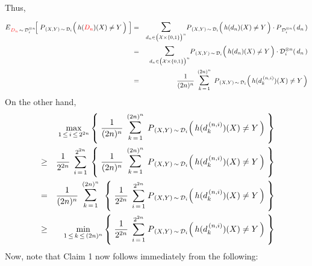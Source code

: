 Thus,
\begin{eqnarray*}
\overset{{\color{white}\vert}}{E}_{{\color{red}D_{n}}\,\sim\,\mathcal{D}_{i}^{\otimes n}}\!\!\left[\;
	P_{\,(X,Y)\,\sim\,\mathcal{D}_{i}}\!\left(\,h({\color{red}D_{n}})(X) \overset{{\color{white}.}}{\neq} Y\,\right)
	\;\right]
& = &
	\underset{d_{n}\in\left(\mathcal{X}\overset{{\color{white}.}}{\times}\{0,1\}\right)^{n}}{\textnormal{\Large$\sum$}}
	P_{\,(X,Y)\,\sim\,\mathcal{D}_{i}}\!\left(\,h(d_{n})(X) \overset{{\color{white}.}}{\neq} Y\,\right)
	\cdot
	P_{\,\mathcal{D}_{i}^{\otimes n}}(\,d_{n}\,)
\\
& = &
	\underset{d_{n}\in\left(\mathcal{X}\overset{{\color{white}.}}{\times}\{0,1\}\right)^{n}}{\textnormal{\Large$\sum$}}
	P_{\,(X,Y)\,\sim\,\mathcal{D}_{i}}\!\left(\,h(d_{n})(X) \overset{{\color{white}.}}{\neq} Y\,\right)
	\cdot
	\mathcal{D}_{i}^{\otimes n}\!\left(\,d_{n}\,\right)
\\
& = &
	\dfrac{1}{(2n)^{n}}\;\,
	\overset{(2n)^{n}}{\underset{k\,=\,1}{\textnormal{\Large$\sum$}}}\;\,
	P_{\,(X,Y)\,\sim\,\mathcal{D}_{i}}\!\left(\,h(d^{\,(n,i)}_{k})(X) \overset{{\color{white}.}}{\neq} Y\,\right)
\end{eqnarray*}
On the other hand,
\begin{eqnarray*}
&&
\underset{1\,\leq\, i \,\leq\, 2^{2n}}{\max}\left\{\;
	\dfrac{1}{(2n)^{n}}\;\,
	\overset{(2n)^{n}}{\underset{k\,=\,1}{\textnormal{\Large$\sum$}}}\;\,
	P_{\,(X,Y)\,\sim\,\mathcal{D}_{i}}\!\left(\,h(d^{\,(n,i)}_{k})(X) \overset{{\color{white}.}}{\neq} Y\,\right)
	\;\right\}
\\
& \geq &
	\dfrac{1}{2^{2n}}\;\,
	\overset{2^{2n}}{\underset{i\,=\,1}{\sum}}\;\left\{\;
		\dfrac{1}{(2n)^{n}}\;\,
		\overset{(2n)^{n}}{\underset{k\,=\,1}{\textnormal{\Large$\sum$}}}\;\,
		P_{\,(X,Y)\,\sim\,\mathcal{D}_{i}}\!\left(\,h(d^{\,(n,i)}_{k})(X) \overset{{\color{white}.}}{\neq} Y\,\right)
		\;\right\}
\\
& = &
	\dfrac{1}{(2n)^{n}}\;\,
	\overset{(2n)^{n}}{\underset{k\,=\,1}{\textnormal{\Large$\sum$}}}\;\,\left\{\;
		\dfrac{1}{2^{2n}}\;\,
		\overset{2^{2n}}{\underset{i\,=\,1}{\sum}}\;
		P_{\,(X,Y)\,\sim\,\mathcal{D}_{i}}\!\left(\,h(d^{\,(n,i)}_{k})(X) \overset{{\color{white}.}}{\neq} Y\,\right)
		\;\right\}
\\
& \geq &
\underset{1\,\leq\, k \,\leq\, (2n)^{n}}{\min}\left\{\;
	\dfrac{1}{2^{2n}}\;\,
	\overset{2^{2n}}{\underset{i\,=\,1}{\sum}}\;
	P_{\,(X,Y)\,\sim\,\mathcal{D}_{i}}\!\left(\,h(d^{\,(n,i)}_{k})(X) \overset{{\color{white}.}}{\neq} Y\,\right)
	\;\right\}
\end{eqnarray*}
Now, note that Claim 1 now follows immediately from the following:

